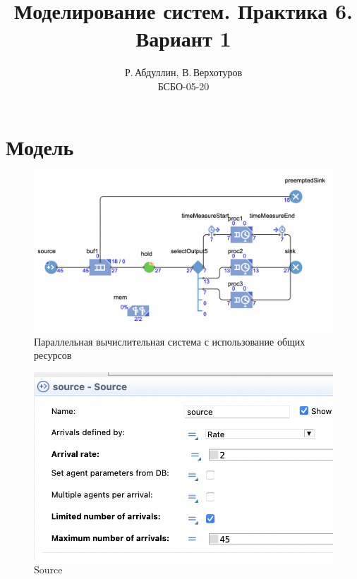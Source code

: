 \documentclass[14pt, a4paper, titlepage]{extarticle}
\title{Моделирование систем. Практика 6. Вариант 1}
\author{Р.\,Абдуллин, В.\,Верхотуров \\  БСБО-05-20}
\affil{РТУ МИРЭА}
\begin{document}
	\maketitle
	
	\section{Модель}
	
	\begin{figure}[H]
		\centering
		\includegraphics[width=.9\textwidth]{model}
		\caption{Параллельная вычислительная система с использование общих ресурсов}
	\end{figure}

	\begin{figure}[H]
		\centering
		\includegraphics[width=.9\textwidth]{source}
		\caption{Source}
	\end{figure}
\end{document}
